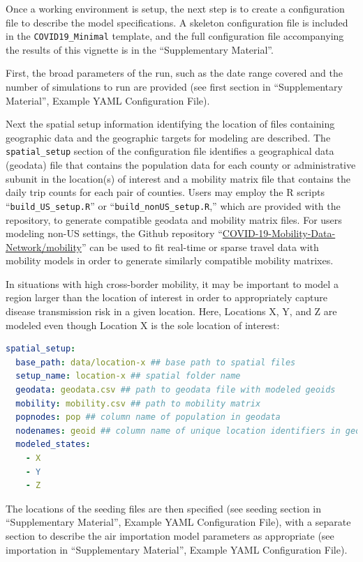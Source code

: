 Once a working environment is setup, the next step is to create a configuration file to describe the model specifications. A skeleton configuration file is included in the \verb|COVID19_Minimal| template, and the full configuration file accompanying the results of this vignette is in the “Supplementary Material”.

First, the broad parameters of the run, such as the date range covered and the number of simulations to run are provided (see first section in “Supplementary Material”, Example YAML Configuration File).

Next the spatial setup information identifying the location of files containing geographic data and the geographic targets for modeling are described. The \verb|spatial_setup| section of the configuration file identifies a geographical data (geodata) file that contains the population data for each county or administrative subunit in the location(s) of interest and a mobility matrix file that contains the daily trip counts for each pair of counties. Users may employ the R scripts “\verb|build_US_setup.R|” or “\verb|build_nonUS_setup.R|,” which are provided with the repository, to generate compatible geodata and mobility matrix files. For users modeling non-US settings, the Github repository “\url{COVID-19-Mobility-Data-Network/mobility}” can be used to fit real-time or sparse travel data with mobility models in order to generate similarly compatible mobility matrixes\cite{Giles:COVID19MobilityDataNetworkMobilityV0:2020,Giles:MobilityPackageModeling:2020}.

In situations with high cross-border mobility, it may be important to model a region larger than the location of interest in order to appropriately capture disease transmission risk in a given location. Here, Locations X, Y, and Z are modeled even though Location X is the sole location of interest:
\begin{lstlisting}[language=yaml]
spatial_setup: 
  base_path: data/location-x ## base path to spatial files 
  setup_name: location-x ## spatial folder name 
  geodata: geodata.csv ## path to geodata file with modeled geoids 
  mobility: mobility.csv ## path to mobility matrix 
  popnodes: pop ## column name of population in geodata 
  nodenames: geoid ## column name of unique location identifiers in geodata 
  modeled_states: 
    - X 
    - Y 
    - Z
\end{lstlisting}

The locations of the seeding files are then specified (see seeding section in “Supplementary Material”, Example YAML Configuration File), with a separate section to describe the air importation model parameters as appropriate (see importation in “Supplementary Material”, Example YAML Configuration File).

